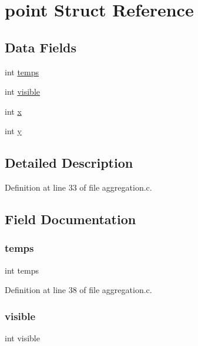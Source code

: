 \hypertarget{structpoint}{}\section{point Struct Reference}
\label{structpoint}
\subsection*{Data Fields}
\begin{DoxyCompactItemize}
\item 
int \hyperlink{structpoint_ac85a28512daa89028cd4dd0024a04ab1}{temps}
\item 
int \hyperlink{structpoint_a1dc0236b1bb47613cbf3ca7033830321}{visible}
\item 
int \hyperlink{structpoint_a6150e0515f7202e2fb518f7206ed97dc}{x}
\item 
int \hyperlink{structpoint_a0a2f84ed7838f07779ae24c5a9086d33}{y}
\end{DoxyCompactItemize}


\subsection{Detailed Description}


Definition at line 33 of file aggregation.\+c.



\subsection{Field Documentation}
\hypertarget{structpoint_ac85a28512daa89028cd4dd0024a04ab1}{}\label{structpoint_ac85a28512daa89028cd4dd0024a04ab1} 
\subsubsection{\texorpdfstring{temps}{temps}}
{\footnotesize\ttfamily int temps}



Definition at line 38 of file aggregation.\+c.

\hypertarget{structpoint_a1dc0236b1bb47613cbf3ca7033830321}{}\label{structpoint_a1dc0236b1bb47613cbf3ca7033830321} 
\subsubsection{\texorpdfstring{visible}{visible}}
{\footnotesize\ttfamily int visible}




